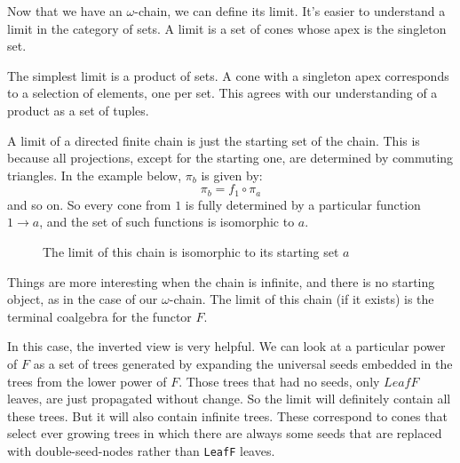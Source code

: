 \documentclass[11pt]{amsart}
\newcommand{\hask}[1]{\texttt{#1}}
\begin{document}
Now that we have an $\omega$-chain, we can define its limit. It's easier to understand a limit in the category of sets. A limit is a set of cones whose apex is the singleton set. 

The simplest limit is a product of sets. A cone with a singleton apex corresponds to a selection of elements, one per set. This agrees with our understanding of a product as a set of tuples. 

A limit of a directed finite chain is just the starting set of the chain. This is because all projections, except for the starting one, are determined by commuting triangles. In the example below, $\pi_b$ is given by:
\[\pi_b = f_1 \circ \pi_a\]
and so on. So every cone from $1$ is fully determined by a particular function $1 \to a$, and the set of such functions is isomorphic to $a$.
\begin{figure}[H]
\centering
{}
\caption{The limit of this chain is isomorphic to its starting set $a$}
\end{figure}

Things are more interesting when the chain is infinite, and there is no starting object, as in the case of our $\omega$-chain. The limit of this chain (if it exists) is the terminal coalgebra for the functor $F$.

\begin{figure}[H]
\centering
{}
\end{figure}

In this case, the inverted view is very helpful. We can look at a particular power of $F$ as a set of trees generated by expanding the universal seeds embedded in the trees from the lower power of $F$. Those trees that had no seeds, only $LeafF$ leaves, are just propagated without change. So the limit will definitely contain all these trees. But it will also contain infinite trees. These correspond to cones that select ever growing trees in which there are always some seeds that are replaced with double-seed-nodes rather than \hask{LeafF} leaves.
\end{document}
